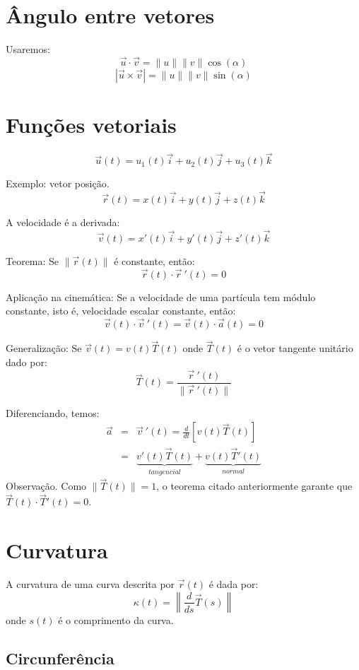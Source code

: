 \documentclass[a4paper,10pt]{book}
\begin{document}
\section{Ângulo entre vetores}

Usaremos:
$$\vec{u}\cdot\vec{v} = \|u\|\|v\|\cos(\alpha)$$
$$|\vec{u}\times\vec{v}| = \|u\|\|v\|\sin(\alpha)$$


\section{Funções vetoriais}

$$\vec{u}(t) = u_1(t)\vec{i}+u_2(t)\vec{j}+u_3(t)\vec{k}$$

Exemplo: vetor posição.
$$\vec{r}(t) = x(t)\vec{i}+y(t)\vec{j}+z(t)\vec{k}$$

A velocidade é a derivada:
$$\vec{v}(t) = x'(t)\vec{i}+y'(t)\vec{j}+z'(t)\vec{k}$$

Teorema:
Se $\|\vec{r}(t)\|$ é constante, então:
$$\vec{r}(t)\cdot \vec{r}\!~'(t)=0$$


Aplicação na cinemática:
Se a velocidade de uma partícula tem módulo constante, isto é, velocidade escalar constante, então:
$$\vec{v}(t)\cdot \vec{v}\!~'(t)=\vec{v}(t)\cdot \vec{a}(t)=0$$

Generalização:
Se $\vec{v}(t)=v(t)\vec{T}(t)$
onde $\vec{T}(t)$ é o vetor tangente unitário dado por:
$$\vec{T}(t) = \frac{\vec{r}~\!'(t)}{\|\vec{r}~\!'(t)\|} $$

Diferenciando, temos:
\begin{eqnarray*}
 \vec{a}&=&\vec{v}~\!'(t)=\frac{d}{dt}\left[v(t)\vec{T}(t)\right]\\
 &=&\underbrace{v'(t)\vec{T}(t)}_{tangencial}+\underbrace{v(t)\vec{T}'(t)}_{normal}
\end{eqnarray*}
Observação. Como $\|\vec{T}(t)\|=1$, o teorema citado anteriormente garante que $\vec{T}(t)\cdot\vec{T}'(t)=0$.

\section{Curvatura}
A curvatura de uma curva descrita por $\vec{r}(t)$ é dada por:
$$\kappa(t) = \left\|\frac{d}{ds}\vec{T}(s)\right\|$$
onde $s(t)$ é o comprimento da curva.

\subsection{Circunferência}
\end{document}
